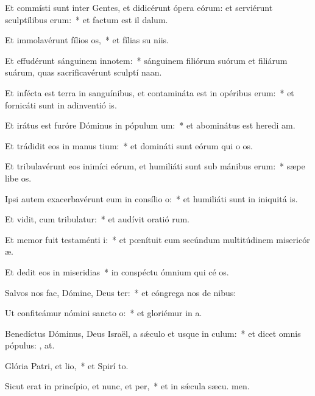\item Et commísti sunt inter Gentes, et didicérunt ópera eórum: et serviérunt sculptílibus erum:~* et factum est il  dalum.
\item Et immolavérunt fílios os,~* et fílias su niis.
\item Et effudérunt sánguinem innotem:~* sánguinem filiórum suórum et filiárum suárum, quas sacrificavérunt sculptí naan.
\item Et infécta est terra in sanguínibus, et contamináta est in opéribus erum:~* et fornicáti sunt in adinventió is.
\item Et irátus est furóre Dóminus in pópulum um:~* et abominátus est heredi am.
\item Et trádidit eos in manus tium:~* et domináti sunt eórum qui o os.
\item Et tribulavérunt eos inimíci eórum, et humiliáti sunt sub mánibus erum:~* sæpe libe os.
\item Ipsi autem exacerbavérunt eum in consílio o:~* et humiliáti sunt in iniquitá is.
\item Et vidit, cum tribulatur:~* et audívit oratió rum.
\item Et memor fuit testaménti i:~* et pœnítuit eum secúndum multitúdinem misericór æ.
\item Et dedit eos in miseridias~* in conspéctu ómnium qui cé os.
\item Salvos nos fac, Dómine, Deus ter:~* et cóngrega nos de nibus:
\item Ut confiteámur nómini sancto o:~* et gloriémur in  a.
\item Benedíctus Dóminus, Deus Israël, a sǽculo et usque in culum:~* et dicet omnis pópulus: , at.
\item Glória Patri, et lio,~* et Spirí to.
\item Sicut erat in princípio, et nunc, et per,~* et in sǽcula sæcu. men.
